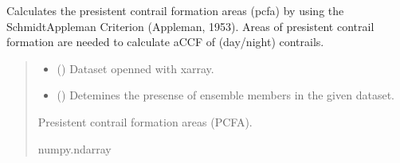 \documentclass[a4paper,11pt,english]{sphinxmanual}
\begin{document}
\begin{fulllineitems}
\label{\detokenize{modules:envlib.contrail.get_pcfa}}
\pysigstartsignatures
{}
\pysigstopsignatures
\sphinxAtStartPar
Calculates the presistent contrail formation areas (pcfa) by using the Schmidt\sphinxhyphen{}Appleman Criterion (Appleman, 1953). Areas of presistent contrail formation are needed to calculate aCCF of (day/night) contrails.
\begin{quote}\begin{description}
\begin{itemize}
\item {} 
\sphinxAtStartPar
{} () \textendash{} Dataset openned with xarray.

\item {} 
\sphinxAtStartPar
{} () \textendash{} Detemines the presense of ensemble members in the given dataset.

\end{itemize}

\sphinxAtStartPar
Presistent contrail formation areas (PCFA).

\sphinxAtStartPar
numpy.ndarray

\end{description}\end{quote}

\end{fulllineitems}

\end{document}
